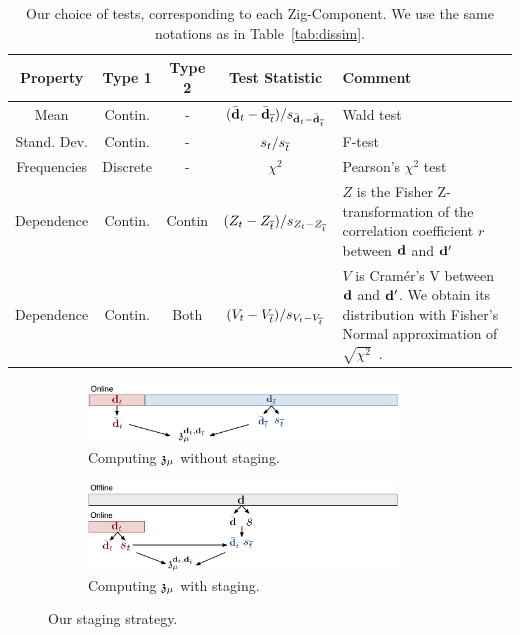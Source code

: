 \begin{table}[t!]
    \centering
    \begin{tabular}{c c c c p{8.5cm}}
    \rowcolor{gray!50}
      \hline
      Property & Type 1 & Type 2 & Test Statistic & Comment\\
      \hline
      Mean & Contin.  & - & $(\bar{\bf{d}}_t - \bar{\bf{d}}_{\overline{t}})/s_{\bar{\bf{d}}_t - \bar{\bf{d}}_{\overline{t}}}$ &
        Wald test~\cite{wasserman2013all}  \\
        Stand. Dev.& Contin.  & - & $s_t / s_{\overline{t}}$ &
        F-test~\cite{cohen1977statistical} \\
        Frequencies & Discrete & - & $\chi^2$ & Pearson's $\chi^2$
        test~\cite{wasserman2013all}\\
      Dependence  & Contin. & Contin & $(Z_t - 
      Z_{\overline{t}})/s_{Z_t - Z_{\overline{t}}}$ & $Z$ is the Fisher
      Z-transformation of the correlation coefficient $r$ between $\bf{d}$ and
      $\bf{d}'$~\cite{fisher1915frequency}\\
      Dependence  & Contin. & Both &  $(V_t - V_{\overline{t}})/s_{V_t-V_{\overline{t}}}$ & $V$ is
      Cram\'er's V between $\bf{d}$ and $\bf{d}'$. We obtain its distribution with Fisher's
      Normal approximation of $\sqrt{\chi^2}$~\cite{patel1996handbook}.\\ 
      \hline
    \end{tabular}
\caption{Our choice of tests, corresponding to each Zig-Component. We use the
same notations as in Table~\ref{tab:dissim}.}
    \label{tab:tests}
\end{table}
\begin{figure}[t!]
    \centering
    \begin{subfigure}[b]{\columnwidth}
    \includegraphics[width=0.9\textwidth]{Figures/Staging}
    \caption{Computing $\mathfrak{z}_\mu$ without staging.}
    \label{pic:withoutstag}
    \end{subfigure}

    \begin{subfigure}[b]{\columnwidth}
        \includegraphics[width=0.9\textwidth]{Figures/Staging2}
    \caption{Computing  $\mathfrak{z}_\mu$  with staging.}
    \label{pic:withstag}
    \end{subfigure}
    \caption{Our staging strategy.}
\end{figure}


